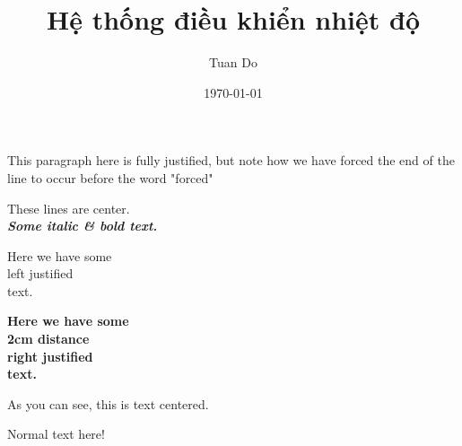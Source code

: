 \documentclass[a4paper, 11pt]{article}
\title{Hệ thống điều khiển nhiệt độ}
\author{Tuan Do}
\date{\today}
\begin{document}
	\maketitle
	\noindent
	This paragraph here is fully justified, but note how we have forced the end of the line to occur before the word "forced"\\
	\begin{center}
		These lines are center.\\
		\textbf{\textit{Some italic \& bold text.}} 
	\end{center}
	
	\begin{flushleft}
		{\Huge
		Here we have some\\
		left justified\\
		text.}
	\end{flushleft}
	\begin{flushright}
		\textbf{Here we have some\\[2cm]
		2cm distance\\
		right justified\\
		text.}
	\end{flushright}
	\begin{center}
		As you can see, this is text centered.
	\end{center}
	Normal text here!
	
	
	
		
	
\end{document}
